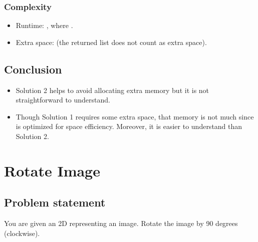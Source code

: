 \documentclass[letterpaper,12pt,english]{book}
\begin{document}
\subsubsection{Complexity}
\label{\detokenize{Array/01_ARR_448_Find_All_Numbers_Disappeared_in_an_Array:id2}}\begin{itemize}
\item {} 
\sphinxAtStartPar
Runtime: , where .

\item {} 
\sphinxAtStartPar
Extra space:  (the returned list does not count as extra space).

\end{itemize}


\subsection{Conclusion}
\label{\detokenize{Array/01_ARR_448_Find_All_Numbers_Disappeared_in_an_Array:conclusion}}\begin{itemize}
\item {} 
\sphinxAtStartPar
Solution 2 helps to avoid allocating extra memory but it is not straightforward to understand.

\item {} 
\sphinxAtStartPar
Though Solution 1 requires some extra space, that memory is not much since  is optimized for space efficiency. Moreover, it is easier to understand than Solution 2.

\end{itemize}

\sphinxstepscope


\section{Rotate Image}
\label{\detokenize{Array/01_ARR_48_Rotate_Image:rotate-image}}\label{\detokenize{Array/01_ARR_48_Rotate_Image::doc}}

\subsection{Problem statement\sphinxfootnotemark[7]}
\label{\detokenize{Array/01_ARR_48_Rotate_Image:problem-statement}}%
\begin{footnotetext}[7]\sphinxAtStartFootnote
{}
%
\end{footnotetext}\ignorespaces 
\sphinxAtStartPar
You are given an  2D  representing an image. Rotate the image by 90 degrees (clockwise).
\end{document}
